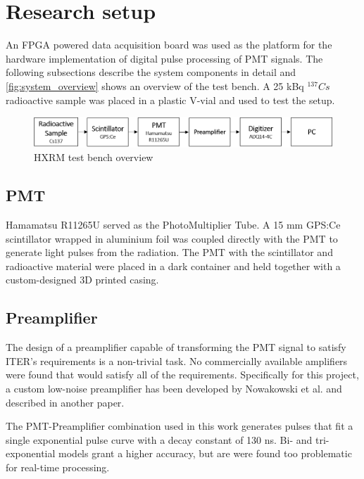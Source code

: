 \section{Research setup}

An FPGA powered data acquisition board was used as the platform 
for the hardware implementation of digital pulse processing of PMT
signals.
The following subsections describe the system components in detail and
\autoref{fig:system_overview} shows an overview of the test bench.
A 25 kBq $^{137} Cs$ radioactive sample was placed in a plastic V-vial
and used to test the setup.

\begin{figure}[H]
  \centering
  \includegraphics[width=\linewidth]{media/system_overview.png}
  \caption{HXRM test bench overview}
  \label{fig:system_overview} 
\end{figure}

\subsection{PMT}

Hamamatsu R11265U served as the PhotoMultiplier Tube. 
A 15 mm GPS:Ce scintillator wrapped in aluminium foil was 
coupled directly with the PMT to generate light pulses
from the radiation. The PMT with the scintillator and radioactive material
were placed in a dark container and held together with a 
custom-designed 3D printed casing.

\subsection{Preamplifier}

The design of a preamplifier capable of transforming the PMT signal
to satisfy ITER's requirements is a non-trivial task.
No commercially available amplifiers were found
that would satisfy all of the requirements.
Specifically for this project, a custom low-noise preamplifier 
has been developed by Nowakowski et al. and described in another 
paper. 
\cite{low_noise_amplifier_for_pmt}


The PMT-Preamplifier combination used in this work generates pulses that 
fit a single exponential pulse curve with a decay constant of 130 ns.
Bi- and tri-exponential models grant a higher accuracy, but
are were found too problematic for real-time processing. 

